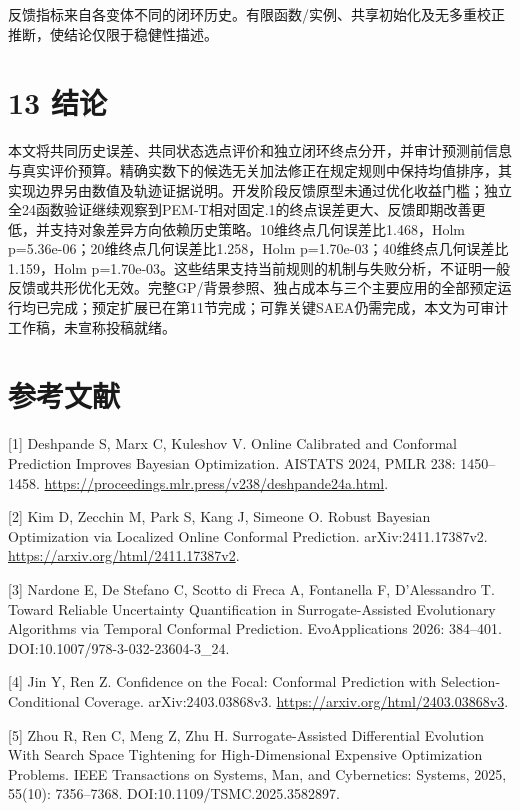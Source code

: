 \documentclass[11pt,a4paper]{article}
\begin{document}
反馈指标来自各变体不同的闭环历史。有限函数/实例、共享初始化及无多重校正推断，使结论仅限于稳健性描述。

\hypertarget{ux7ed3ux8bba}{%
\section{13 结论}\label{ux7ed3ux8bba}}

本文将共同历史误差、共同状态选点评价和独立闭环终点分开，并审计预测前信息与真实评价预算。精确实数下的候选无关加法修正在规定规则中保持均值排序，其实现边界另由数值及轨迹证据说明。开发阶段反馈原型未通过优化收益门槛；独立全24函数验证继续观察到PEM-T相对固定.1的终点误差更大、反馈即期改善更低，并支持对象差异方向依赖历史策略。10维终点几何误差比1.468，Holm
p=5.36e-06；20维终点几何误差比1.258，Holm
p=1.70e-03；40维终点几何误差比1.159，Holm
p=1.70e-03。这些结果支持当前规则的机制与失败分析，不证明一般反馈或共形优化无效。完整GP/背景参照、独占成本与三个主要应用的全部预定运行均已完成；预定扩展已在第11节完成；可靠关键SAEA仍需完成，本文为可审计工作稿，未宣称投稿就绪。

\hypertarget{ux53c2ux8003ux6587ux732e}{%
\section{参考文献}\label{ux53c2ux8003ux6587ux732e}}

{[}1{]} Deshpande S, Marx C, Kuleshov V. Online Calibrated and Conformal
Prediction Improves Bayesian Optimization. AISTATS 2024, PMLR 238:
1450--1458. \url{https://proceedings.mlr.press/v238/deshpande24a.html}.

{[}2{]} Kim D, Zecchin M, Park S, Kang J, Simeone O. Robust Bayesian
Optimization via Localized Online Conformal Prediction.
arXiv:2411.17387v2. \url{https://arxiv.org/html/2411.17387v2}.

{[}3{]} Nardone E, De Stefano C, Scotto di Freca A, Fontanella F,
D'Alessandro T. Toward Reliable Uncertainty Quantification in
Surrogate-Assisted Evolutionary Algorithms via Temporal Conformal
Prediction. EvoApplications 2026: 384--401.
DOI:10.1007/978-3-032-23604-3\_24.

{[}4{]} Jin Y, Ren Z. Confidence on the Focal: Conformal Prediction with
Selection-Conditional Coverage. arXiv:2403.03868v3.
\url{https://arxiv.org/html/2403.03868v3}.

{[}5{]} Zhou R, Ren C, Meng Z, Zhu H. Surrogate-Assisted Differential
Evolution With Search Space Tightening for High-Dimensional Expensive
Optimization Problems. IEEE Transactions on Systems, Man, and
Cybernetics: Systems, 2025, 55(10): 7356--7368.
DOI:10.1109/TSMC.2025.3582897.
\end{document}
